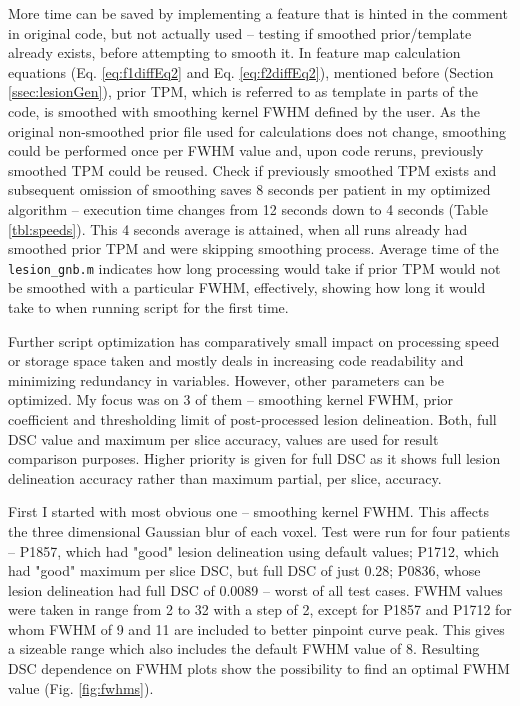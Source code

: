 \documentclass[12pt]{article}
\begin{document}
More time can be saved by implementing a feature that is hinted in the comment in original code, but not actually used – testing if smoothed prior/template already exists, before attempting to smooth it. In feature map calculation equations (Eq. \ref{eq:f1diffEq2} and Eq. \ref{eq:f2diffEq2}), mentioned before (Section \ref{ssec:lesionGen}), prior TPM, which is referred to as template in parts of the code, is smoothed with smoothing kernel FWHM defined by the user. As the original non-smoothed prior file used for calculations does not change, smoothing could be performed once per FWHM value and, upon code reruns, previously smoothed TPM could be reused. Check if previously smoothed TPM exists and subsequent omission of smoothing saves 8 seconds per patient in my optimized algorithm – execution time changes from 12 seconds down to 4 seconds (Table \ref{tbl:speeds}). This 4 seconds average is attained, when all runs already had smoothed prior TPM and were skipping smoothing process. Average time of the \texttt{lesion\_gnb.m} indicates how long processing would take if prior TPM would not be smoothed with a particular FWHM, effectively, showing how long it would take to when running script for the first time.

Further script optimization has comparatively small impact on processing speed or storage space taken and mostly deals in increasing code readability and minimizing redundancy in variables. However, other parameters can be optimized. My focus was on 3 of them – smoothing kernel FWHM, prior coefficient and thresholding limit of post-processed lesion delineation. Both, full DSC value and maximum per slice accuracy, values are used for result comparison purposes. Higher priority is given for full DSC as it shows full lesion delineation accuracy rather than maximum partial, per slice, accuracy.

First I started with most obvious one – smoothing kernel FWHM. This affects the three dimensional Gaussian blur of each voxel. Test were run for four  patients – P1857, which had "good" lesion delineation using default values; P1712, which had "good" maximum per slice DSC, but full DSC of just 0.28; P0836, whose lesion delineation  had full DSC of 0.0089 – worst of all test cases. FWHM values were taken in range from 2 to 32 with a step of 2, except for P1857 and P1712 for whom FWHM of 9 and 11 are included to better pinpoint curve peak. This gives a sizeable range which also includes the default FWHM value of 8. Resulting DSC dependence on FWHM plots show the possibility to find an optimal FWHM value (Fig. \ref{fig:fwhms}).
\end{document}
